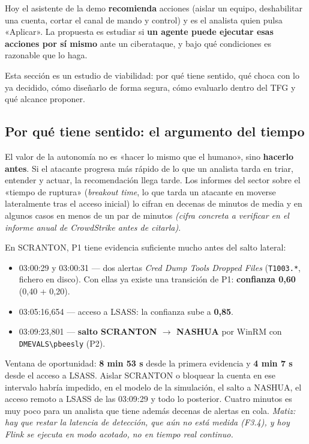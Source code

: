 \documentclass[11pt,a4paper]{article}
\newcommand{\cod}[1]{\texttt{#1}}
\newcommand{\flecha}{$\rightarrow$}
\begin{document}
\begin{nuevo}[La idea]
Hoy el asistente de la demo \textbf{recomienda} acciones (aislar un equipo, deshabilitar una cuenta, cortar el
canal de mando y control) y es el analista quien pulsa «Aplicar». La propuesta es estudiar si \textbf{un agente
puede ejecutar esas acciones por sí mismo} ante un ciberataque, y bajo qué condiciones es razonable que lo haga.
\end{nuevo}

Esta sección es un estudio de viabilidad: por qué tiene sentido, qué choca con lo ya decidido, cómo diseñarlo
de forma segura, cómo evaluarlo dentro del TFG y qué alcance proponer.

\subsection{Por qué tiene sentido: el argumento del tiempo}

El valor de la autonomía no es «hacer lo mismo que el humano», sino \textbf{hacerlo antes}. Si el atacante
progresa más rápido de lo que un analista tarda en triar, entender y actuar, la recomendación llega tarde.
Los informes del sector sobre el «tiempo de ruptura» (\textit{breakout time}, lo que tarda un atacante en
moverse lateralmente tras el acceso inicial) lo cifran en decenas de minutos de media y en algunos casos en
menos de un par de minutos \textit{(cifra concreta a verificar en el informe anual de CrowdStrike antes de citarla)}.

\begin{dato}
En SCRANTON, P1 tiene evidencia suficiente mucho antes del salto lateral:
\begin{itemize}
  \item 03:00:29 y 03:00:31 — dos alertas \textit{Cred Dump Tools Dropped Files} (\cod{T1003.*}, fichero en disco).
        Con ellas ya existe una transición de P1: \textbf{confianza 0,60} (0,40 + 0,20).
  \item 03:05:16,654 — acceso a LSASS: la confianza sube a \textbf{0,85}.
  \item 03:09:23,801 — \textbf{salto SCRANTON \flecha{} NASHUA} por WinRM con \cod{DMEVALS\textbackslash pbeesly} (P2).
\end{itemize}
Ventana de oportunidad: \textbf{8 min 53 s} desde la primera evidencia y \textbf{4 min 7 s} desde el acceso a LSASS.
Aislar SCRANTON o bloquear la cuenta en ese intervalo habría impedido, en el modelo de la simulación, el salto a
NASHUA, el acceso remoto a LSASS de las 03:09:29 y todo lo posterior. Cuatro minutos es muy poco para un analista
que tiene además decenas de alertas en cola. \textit{Matiz: hay que restar la latencia de detección, que aún no
está medida (F3.4), y hoy Flink se ejecuta en modo acotado, no en tiempo real continuo.}
\end{dato}
\end{document}
